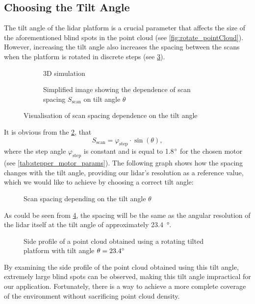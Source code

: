 \subsection{Choosing the Tilt Angle}
The tilt angle of the \gls{lidar} platform is a crucial parameter that affects the size of the aforementioned blind spots in the point cloud (see \cref{fig:rotate_pointCloud}).
However, increasing the tilt angle also increases the spacing between the scans when the platform is rotated in discrete steps (see \cref{fig:scan_spacing}). 
\begin{figure}[h!]
    \centering
    
    \begin{subfigure}{0.45\linewidth}
        \centering
        
        \caption{3D simulation}
        \label{fig:scan_spacing:3d}
    \end{subfigure}
    \hfill
    \begin{subfigure}{0.45\linewidth}
        \centering
        
        \caption{Simplified image showing the dependence of scan spacing $S_{\text{scan}}$ on tilt angle $\theta$}
        \label{fig:scan_spacing:tikz}
    \end{subfigure}

    \caption{Visualisation of scan spacing dependence on the tilt angle}
    \label{fig:scan_spacing}
\end{figure}
It is obvious from the \cref{fig:scan_spacing:tikz}, that
\begin{equation}
    S_{\text{scan}} = \varphi_{\text{step}}\cdot\sin(\theta),
\end{equation}
where the step angle $\varphi_{\text{step}}$ is constant and is equal to 1.8$\degree$ for the chosen motor (see \cref{tab:stepper_motor_params}).
The following graph shows how the spacing changes with the tilt angle, providing our \gls{lidar}'s resolution as a reference value, which we would like to achieve by choosing a correct tilt angle:
\begin{figure}[H]
    \centering
    
    \caption{Scan spacing depending on the tilt angle $\theta$}
    \label{fig:angleRes_tiltOnly}
\end{figure}    
As could be seen from \cref{fig:angleRes_tiltOnly}, the spacing will be the same as the angular resolution of the \gls{lidar} itself at the tilt angle of approximately \SI{23.4}{\degree}.
\begin{figure}[H]
    \centering
    
    \caption{Side profile of a point cloud obtained using a rotating tilted platform with tilt angle $\theta=23.4\degree$}
    \label{fig:23point4rotate_pointCloud}
\end{figure}
By examining the side profile of the point cloud obtained using this tilt angle, extremely large blind spots can be observed, making this tilt angle impractical for our application.
Fortunately, there is a way to achieve a more complete coverage of the environment without sacrificing point cloud density.
